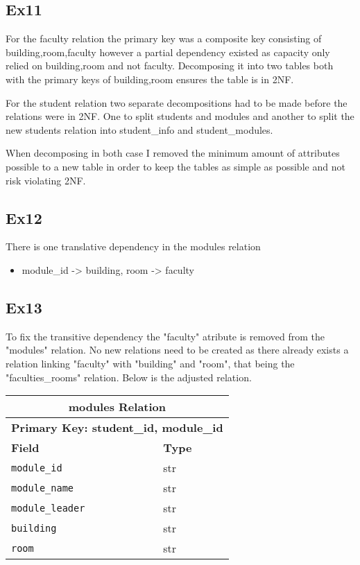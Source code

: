 \documentclass{article}
\begin{document}
\raggedright
\subsection{Ex11}
For the faculty relation the primary key was a composite key consisting of building,room,faculty however a partial dependency existed as capacity only relied on building,room and not faculty. Decomposing it into two tables both with the primary keys of building,room ensures the table is in 2NF.\newline

For the student relation two separate decompositions had to be made before the relations were in 2NF. One to split students and modules and another to split the new students relation into student\_info and student\_modules.\newline

When decomposing in both case I removed the minimum amount of attributes possible to a new table in order to keep the tables as simple as possible and not risk violating 2NF. 

\subsection{Ex12}
There is one translative dependency in the modules relation
\begin{itemize}
    \item module\_id -> building, room -> faculty
\end{itemize}


\newpage
\subsection{Ex13}
To fix the transitive dependency the "faculty" atribute is removed from the "modules" relation. No new relations need to be created as there already exists a relation linking "faculty" with "building" and "room", that being the "faculties\_rooms" relation. Below is the adjusted relation.


\begin{table}[H]
    \centering
    \begin{tabularx}{\textwidth}{|X|X|} %
    \hline
    \multicolumn{2}{|c|}{\textbf{modules Relation}} \\
        \hline
    \multicolumn{2}{|c|}{\textbf{Primary Key: student\_id, module\_id}} \\
    \hline
        \textbf{Field} & \textbf{Type} \\
        \hline
        \verb|module_id| & str \\
        \hline
        \verb|module_name| & str \\
        \hline
        \verb|module_leader| & str \\
        \hline
        \verb|building| & str \\
        \hline
        \verb|room| & str \\
        \hline
    \end{tabularx}
\end{table}
\end{document}
